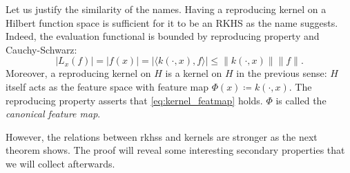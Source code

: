 Let us justify the similarity of the names.
Having a reproducing kernel on a Hilbert function space
is sufficient for it to be an RKHS as the name suggests.
Indeed, the evaluation functional is bounded by reproducing 
property and Cauchy-Schwarz:
\begin{equation*}
    |L_x(f)| = |f(x)| = |\langle k(\cdot,x),f \rangle|
        \leq \|k(\cdot,x)\| \|f\|.
\end{equation*}
Moreover, a reproducing kernel on $H$ is a kernel on $H$ in 
the previous sense: $H$ itself acts as the feature space with 
feature map $\Phi(x) \coloneqq k(\cdot,x)$.
The reproducing property asserts that \cref{eq:kernel_featmap} 
holds.
$\Phi$ is called the \emph{canonical feature map}.

However, the relations between rkhss and kernels
are stronger as the next theorem shows.
The proof will reveal some interesting secondary properties that 
we will collect afterwards.

